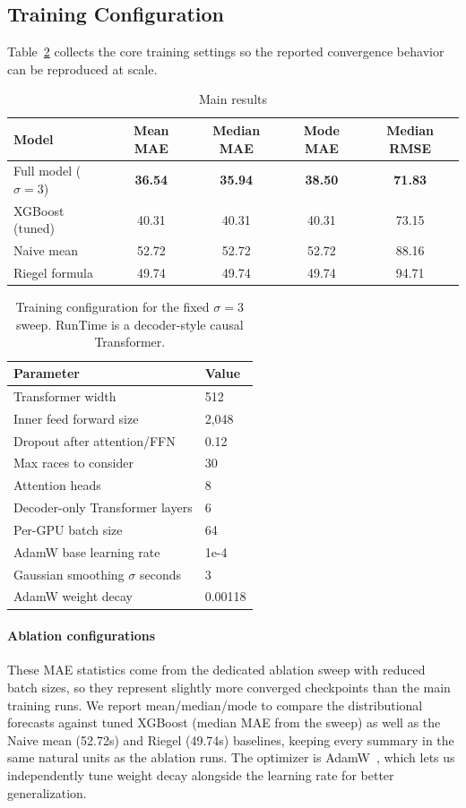 \documentclass{article}
\begin{document}
\subsection{Training Configuration}
Table~\ref{tab:train-config} collects the core training settings so the reported convergence behavior can be reproduced at scale.
\begin{table}[h]
\centering
\caption{Main results}
\label{tab:main-results}
\begin{tabular}{lcccc}
\toprule
Model & Mean MAE & Median MAE & Mode MAE & Median RMSE \\
\midrule
Full model (\(\sigma=3\)) & \textbf{36.54} & \textbf{35.94} & \textbf{38.50} & \textbf{71.83} \\
XGBoost (tuned) & 40.31 & 40.31 & 40.31 & 73.15 \\
Naive mean & 52.72 & 52.72 & 52.72 & 88.16 \\
Riegel formula & 49.74 & 49.74 & 49.74 & 94.71 \\
\bottomrule
\end{tabular}
\end{table}

\begin{table}[h]
\centering
\caption{Training configuration for the fixed \(\sigma=3\) sweep. RunTime is a decoder-style causal Transformer.}
\label{tab:train-config}
\begin{tabular}{ll}
\toprule
Parameter & Value \\
\midrule
Transformer width & 512 \\
Inner feed forward size & 2,048 \\
Dropout after attention/FFN & 0.12 \\
Max races to consider & 30 \\
Attention heads & 8 \\
Decoder-only Transformer layers & 6 \\
Per-GPU batch size & 64 \\
AdamW base learning rate & 1e-4 \\
Gaussian smoothing \(\sigma\) seconds & 3 \\
AdamW weight decay & 0.00118 \\
\bottomrule
\end{tabular}
\end{table}
\paragraph{Ablation configurations} These MAE statistics come from the dedicated ablation sweep with reduced batch sizes, so they represent slightly more converged checkpoints than the main training runs. We report mean/median/mode to compare the distributional forecasts against tuned XGBoost (median MAE from the sweep) as well as the Naive mean (52.72s) and Riegel (49.74s) baselines, keeping every summary in the same natural units as the ablation runs. The optimizer is AdamW~\cite{loshchilov2019decoupled}, which lets us independently tune weight decay alongside the learning rate for better generalization.
\end{document}
